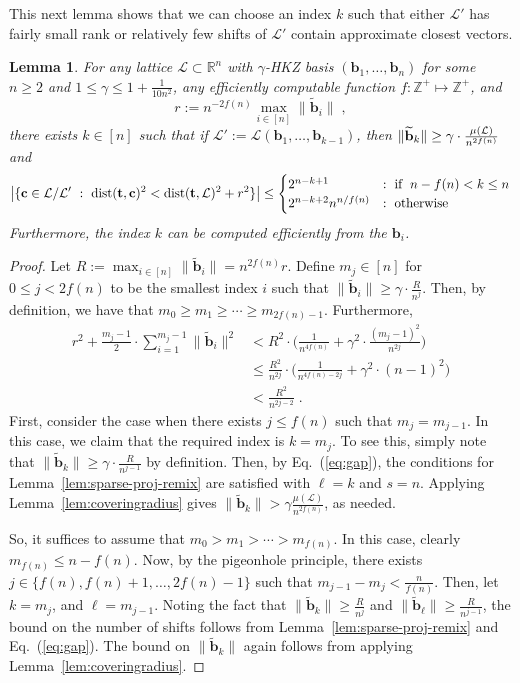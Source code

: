 \documentclass[11pt]{article}
\newtheorem{lemma}[theorem]{Lemma}
\newcommand{\R}{\ensuremath{\mathbb{R}}}
\newcommand{\Z}{\ensuremath{\mathbb{Z}}}
\renewcommand{\vec}[1]{\ensuremath{\mathbf{#1}}}
\newcommand{\lat}{\mathcal{L}}
\newcommand{\gs}[1]{\ensuremath{\widetilde{#1}}}
\DeclareMathOperator{\dist}{dist}
\DeclarePairedDelimiter\set{\{}{\}}
\DeclarePairedDelimiter\length{\lVert}{\rVert}
\begin{document}
This next lemma shows that we can choose an index $k$ such that either $\lat'$ has fairly small rank or relatively few shifts of $\lat'$ contain approximate closest vectors.

\begin{lemma}
\label{lem:good-index}
For any lattice $\lat \subset \R^n$ with $\gamma$-HKZ basis $(\vec{b}_1,\ldots, \vec{b}_n)$ for some $n \geq 2$ and $1 \leq \gamma \leq 1+\frac{1}{10n^2}$, any efficiently computable function $f : \Z^+ \mapsto \Z^+$, and
 \[
 r := n^{-2f(n)} \max_{i \in [n]} \|\gs{\vec{b}}_i\| \; , 
\]
there exists $k \in [n]$ such that
 if $\lat' := \lat(\vec{b}_1,\ldots, \vec{b}_{k-1})$, then $\length{\gs{\vec{b}}_k} \geq \gamma \cdot \frac{\mu(\lat)}{n^{2f(n)}}$ and
\[
\big| \set{ \vec{c} \in \lat/\lat'\ :\ \dist(\vec{t}, \vec{c})^2 <
\dist(\vec{t}, \lat)^2 + r^2} \big| \leq \begin{cases} 2^{n-k+1}&:  \text{ if }\; n-f(n) < k
\leq n \\ 2^{n-k+2}n^{n/f(n)}&: \text{ otherwise} \end{cases}
\]
Furthermore, the index $k$ can be computed efficiently from the $\vec{b}_i$.
\end{lemma}
\begin{proof}
Let $R := \max_{i \in [n]} \|\gs{\vec{b}}_i\| = n^{2f(n)} r$. Define $m_j \in [n]$ for $0 \le j < 2f(n)$ to be the smallest index $i$ such that $ \|\gs{\vec{b}}_{i}\| \ge \gamma \cdot \frac{R}{n^j}$. Then, by definition, we have that $m_0 \ge m_1 \ge \cdots \ge m_{2f(n)-1}$.
Furthermore,
\begin{align}
\label{eq:gap}
r^2 + \frac{m_j-1}{2} \cdot \sum_{i=1}^{m_j-1} \|\gs{\vec{b}}_i\|^2 & < R^2 \cdot \Big(\frac{1}{n^{4f(n)}} + \gamma^2 \cdot \frac{(m_j-1)^2}{n^{2j}} \Big) \nonumber \\  
 & \leq \frac{R^2}{n^{2j}} \cdot \Big(\frac{1}{n^{4f(n)-2j}} + \gamma^2 \cdot (n-1)^2 \Big) \nonumber \\
& < \frac{ R^2}{n^{2j-2}} \;.                                                              
\end{align}
First, consider the case when there exists $j \leq f(n)$ such that $m_{j} = m_{j-1}$. In this case, we claim that the required index is $k = m_j$. To see this, simply note that $\|\gs{\vec{b}}_k\| \ge \gamma \cdot \frac{R}{n^{j-1}}$ by definition. Then, by Eq.~(\ref{eq:gap}), the conditions for Lemma~\ref{lem:sparse-proj-remix} are satisfied with $\ell = k$ and $s = n$.  Applying Lemma~\ref{lem:coveringradius} gives $\|\gs{\vec{b}}_k\| > \gamma \frac{\mu(\lat)}{n^{2f(n)}}$, as needed.

So, it suffices to assume that  $m_0 > m_1 > \cdots > m_{f(n)}$. In this case, clearly $m_{f(n)} \le n - f(n)$. Now, by the pigeonhole principle, there exists $j \in \{f(n), f(n) + 1, \ldots, 2f(n)-1\}$ such that $m_{j-1} - m_j< \frac{n}{f(n)}$. Then, let $k = m_j$, and $\ell = m_{j-1}$. Noting the fact that $\|\gs{\vec{b}}_k\| \ge \frac{R}{n^{j}}$ and $\|\gs{\vec{b}}_\ell\| \ge \frac{R}{n^{j-1}}$, the bound on the number of shifts follows from Lemma~\ref{lem:sparse-proj-remix} and Eq.~(\ref{eq:gap}). The bound on $\|\gs{\vec{b}}_k\|$ again follows from applying Lemma~\ref{lem:coveringradius}.
\end{proof}
\end{document}
